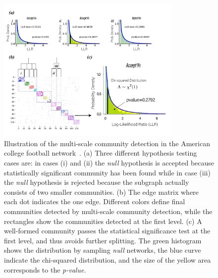 \begin{figure}
    \centering
    \includegraphics[width=0.8\textwidth]{img/chap2/football.pdf}
    \caption{Illustration of the multi-scale community detection in the American college football network~\cite{evans2010clique}. (a) Three different hypothesis testing cases are: in cases (i) and (ii) the {\it null} hypothesis is accepted because statistically significant community has been found while in case (iii) the {\it null} hypothesis is rejected because the subgraph actually consists of two smaller communities. (b) The edge matrix where each dot indicates the one edge. Different colors define final communities detected by multi-scale community detection, while the rectangles show the communities detected at the first level. (c) A well-formed community passes the statistical significance test at the first level, and thus avoids further splitting. The green histogram shows the distribution by sampling {\it null} networks, the blue curve indicate the chi-squared distribution, and the size of the yellow area corresponds to the {\it p-value}.}
    \label{fig:football_pvalues}
\end{figure}




